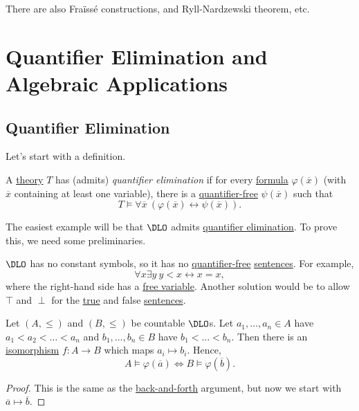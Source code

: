 \begin{remark}
	There are also Fraïssé constructions, and Ryll-Nardzewski theorem, etc.
\end{remark}

\chapter{Quantifier Elimination and Algebraic Applications}
\section{Quantifier Elimination}
Let's start with a definition.

\begin{definition}\label{def:quantifier-elimination}
	A \hyperref[def:theory]{theory} \(T\) has (admits) \emph{quantifier elimination} if for every \hyperref[def:formula]{formula} \(\varphi (\overline{x} )\) (with \(\overline{x} \) containing at least one variable), there is a \hyperref[not:quantifier-free]{quantifier-free} \(\psi (\overline{x} )\) such that
	\[
		T \models \forall \overline{x} \ (\varphi (\overline{x} ) \leftrightarrow \psi (\overline{x} )).
	\]
\end{definition}

The easiest example will be that \(\DLO\) admits \hyperref[def:quantifier-elimination]{quantifier elimination}. To prove this, we need some preliminaries.

\begin{note}
	\(\DLO\) has no constant symbols, so it has no \hyperref[not:quantifier-free]{quantifier-free} \hyperref[def:sentence]{sentences}. For example,
	\[
		\forall x\exists y\ y < x \leftrightarrow x = x,
	\]
	where the right-hand side has a \hyperref[def:free-variable]{free variable}. Another solution would be to allow \(\top\) and \(\perp \) for the \hyperref[def:truth]{true} and false \hyperref[def:sentence]{sentences}.
\end{note}

\begin{lemma}\label{lma:DLO-isomorphism}
	Let \((A, \leq )\) and \((B, \leq )\) be countable \(\DLO\)s. Let \(a_1, \dots , a_n\in A\) have \(a_1 < a_2 < \dots < a_n\) and \(b_1, \dots , b_n \in B\) have \(b_1 < \dots < b_n\). Then there is an \hyperref[def:isomorphism]{isomorphism} \(f\colon A \to B\) which maps \(a_i \mapsto b_i\). Hence,
	\[
		A \models \varphi (\overline{a} ) \iff B \models \varphi (\overline{b} ).
	\]
\end{lemma}
\begin{proof}
	This is the same as the \hyperref[not:back-and-forth]{back-and-forth} argument, but now we start with \(\overline{a} \mapsto \overline{b} \).
\end{proof}

